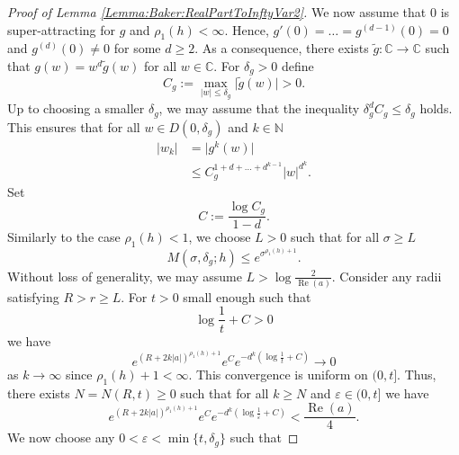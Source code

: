 \documentclass[10pt,a4paper]{amsart}
\renewcommand{\Re}{\operatorname{Re}}
\begin{document}
\begin{proof}[Proof of Lemma {\ref{Lemma:Baker:RealPartToInftyVar2}}]
	We now assume that $0$ is super-attracting for $g$ and $\rho_1(h) < \infty$. Hence, $g'(0) = \dots = g^{(d-1)}(0) = 0$ and $g^{(d)}(0) \neq 0$ for some $d \geq 2$. 
	As a consequence, there exists $\widetilde{g} : \mathbb{C} \to \mathbb{C}$ such that $g(w) = w^d \widetilde{g}(w)$ for all $w \in \mathbb{C}$. For $\delta_g > 0$ define
	\begin{equation*}
		C_g := \max_{\lvert w \rvert \leq \delta_g} \lvert \widetilde{g}(w) \rvert > 0.
	\end{equation*}
	Up to choosing a smaller $\delta_g$, we may assume that the inequality $\delta_g^d C_g \leq \delta_g$ holds.
    This ensures that for all $w \in D(0,\delta_g)$ and $k\in\mathbb{N}$
	\begin{equation}\label{Lemma:Baker:RealPartToInftyVar2:ProofPropIteratesUnderg}
		\begin{split}
			\lvert w_k \rvert &= \lvert g^k(w) \rvert \\
			&\leq C_g^{1 + d + \dots + d^{k-1}} \lvert w \rvert^{d^k}.
		\end{split}
	\end{equation}
	Set
	\begin{equation*}
		C := \frac{\log C_g}{1-d}.
	\end{equation*}
	Similarly to the case $\rho_1(h)<1$, we choose $L > 0$ such that for all $\sigma \geq L$
	\begin{equation*}
		M(\sigma, \delta_g; h) \leq e^{\sigma^{\rho_1(h) + 1}}.
	\end{equation*}
	Without loss of generality, we may assume $L > \log \frac{2}{\Re(a)}$. Consider any radii satisfying $R>r\ge L$. 
	For $t > 0$ small enough such that
	\begin{equation*}
		\log \frac{1}{t} + C > 0
	\end{equation*}
	we have
	\begin{equation*}
		e^{(R + 2k \lvert a \rvert)^{\rho_1(h) + 1}} e^{C}e^{-d^k (\log \frac{1}{t} + C)} \to 0
	\end{equation*}
	as $k \to \infty$ since $\rho_1(h) + 1 < \infty$.
	This convergence is uniform on $(0,t]$. Thus, there exists $N = N(R,t)\ge0$ such that for all $k \geq N$ and $\varepsilon \in (0,t]$ we have
	\begin{equation*}\label{Lemma:Baker:RealPartToInftyVar2:ProofPropN2}
		e^{(R + 2k \lvert a \rvert)^{\rho_1(h) + 1}} e^{C}e^{-d^k (\log \frac{1}{\varepsilon} + C)} < \frac{\Re(a)}{4}.
	\end{equation*}
	We now choose any $0 < \varepsilon < \min\lbrace t, \delta_g \rbrace$ such that

\end{proof}
\end{document}
